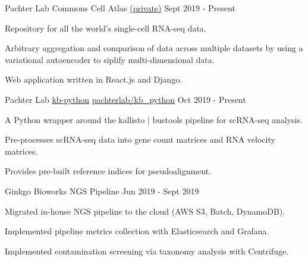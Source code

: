 

\begin{cventries}

\cventry
  {Pachter Lab} %
  {Commons Cell Atlas} %
  {\faGithub\phantom{a}\href{https://github.com/pachterlab/cca-webapp}{(private)}} %
  {Sept 2019 - Present} %
  {
    \begin{cvitems} %
      \item {Repository for all the world's single-cell RNA-seq data.}
      \item {Arbitrary aggregation and comparison of data across multiple datasets by using a variational autoencoder to siplify multi-dimensional data.}
      \item {Web application written in React.js and Django.}
    \end{cvitems}
  }
  
\cventry
  {Pachter Lab} %
  {\href{https://github.com/pachterlab/kb_python}{kb-python}} %
  {\faGithub\phantom{a}\href{https://github.com/pachterlab/kb_python}{pachterlab/kb\_python}} %
  {Oct 2019 - Present} %
  {
    \begin{cvitems} %
      \item {A Python wrapper around the kallisto | bustools pipeline for scRNA-seq analysis.}
      \item {Pre-processes scRNA-seq data into gene count matrices and RNA velocity matrices.}
      \item {Provides pre-built reference indices for pseudoalignment.}
    \end{cvitems}
  }

\cventry
    {Ginkgo Bioworks}
    {NGS Pipeline}
    {}
    {Jun 2019 - Sept 2019}
    {
     \begin{cvitems} %
       \item {Migrated in-house NGS pipeline to the cloud (AWS S3, Batch, DynamoDB).}
       \item {Implemented pipeline metrics collection with Elasticsearch and Grafana.}
       \item {Implemented contamination screening via taxonomy analysis with Centrifuge.}
      \end{cvitems}
    }


\end{cventries}
